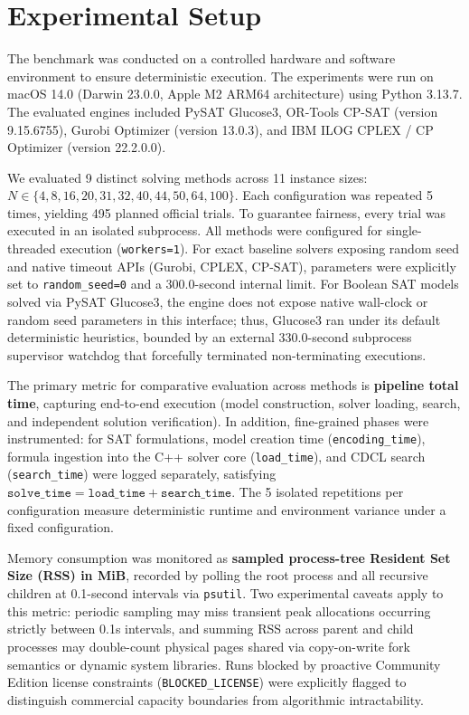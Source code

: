 \section{Experimental Setup}
\label{sec:experimental_setup}

The benchmark was conducted on a controlled hardware and software environment to ensure deterministic execution. The experiments were run on macOS 14.0 (Darwin 23.0.0, Apple M2 ARM64 architecture) using Python 3.13.7. 
The evaluated engines included PySAT Glucose3, OR-Tools CP-SAT (version 9.15.6755), Gurobi Optimizer (version 13.0.3), and IBM ILOG CPLEX / CP Optimizer (version 22.2.0.0).

We evaluated 9 distinct solving methods across 11 instance sizes: $N \in \{4, 8, 16, 20, 31, 32, 40, 44, 50, 64, 100\}$. Each configuration was repeated 5 times, yielding 495 planned official trials.
To guarantee fairness, every trial was executed in an isolated subprocess. All methods were configured for single-threaded execution (\texttt{workers=1}). For exact baseline solvers exposing random seed and native timeout APIs (Gurobi, CPLEX, CP-SAT), parameters were explicitly set to \texttt{random\_seed=0} and a 300.0-second internal limit. For Boolean SAT models solved via PySAT Glucose3, the engine does not expose native wall-clock or random seed parameters in this interface; thus, Glucose3 ran under its default deterministic heuristics, bounded by an external 330.0-second subprocess supervisor watchdog that forcefully terminated non-terminating executions.

The primary metric for comparative evaluation across methods is \textbf{pipeline total time}, capturing end-to-end execution (model construction, solver loading, search, and independent solution verification). In addition, fine-grained phases were instrumented: for SAT formulations, model creation time (\texttt{encoding\_time}), formula ingestion into the C++ solver core (\texttt{load\_time}), and CDCL search (\texttt{search\_time}) were logged separately, satisfying $\texttt{solve\_time} = \texttt{load\_time} + \texttt{search\_time}$. The 5 isolated repetitions per configuration measure deterministic runtime and environment variance under a fixed configuration.

Memory consumption was monitored as \textbf{sampled process-tree Resident Set Size (RSS) in MiB}, recorded by polling the root process and all recursive children at 0.1-second intervals via \texttt{psutil}. Two experimental caveats apply to this metric: periodic sampling may miss transient peak allocations occurring strictly between 0.1s intervals, and summing RSS across parent and child processes may double-count physical pages shared via copy-on-write fork semantics or dynamic system libraries. Runs blocked by proactive Community Edition license constraints (\texttt{BLOCKED\_LICENSE}) were explicitly flagged to distinguish commercial capacity boundaries from algorithmic intractability.

